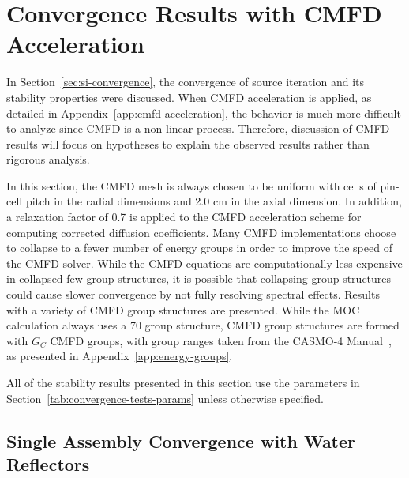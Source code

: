 \section{Convergence Results with CMFD Acceleration}
\label{sec:cmfd-stab}

In Section~\ref{sec:si-convergence}, the convergence of source iteration and its stability properties were discussed. When \ac{CMFD} acceleration is applied, as detailed in Appendix~\ref{app:cmfd-acceleration}, the behavior is much more difficult to analyze since \ac{CMFD} is a non-linear process. Therefore, discussion of \ac{CMFD} results will focus on hypotheses to explain the observed results rather than rigorous analysis. 

In this section, the \ac{CMFD} mesh is always chosen to be uniform with cells of pin-cell pitch in the radial dimensions and 2.0 cm in the axial dimension. In addition, a relaxation factor of 0.7 is applied to the \ac{CMFD} acceleration scheme for computing corrected diffusion coefficients. Many \ac{CMFD} implementations choose to collapse to a fewer number of energy groups in order to improve the speed of the \ac{CMFD} solver. While the \ac{CMFD} equations are computationally less expensive in collapsed few-group structures, it is possible that collapsing group structures could cause slower convergence by not fully resolving spectral effects. Results with a variety of \ac{CMFD} group structures are presented. While the \ac{MOC} calculation always uses a 70 group structure, \ac{CMFD} group structures are formed with $G_C$ \ac{CMFD} groups, with group ranges taken from the CASMO-4 Manual~\cite{edenius1995casmo}, as presented in Appendix~\ref{app:energy-groups}.

All of the stability results presented in this section use the parameters in Section~\ref{tab:convergence-tests-params} unless otherwise specified.

\subsection{Single Assembly Convergence with Water Reflectors}
\label{sec:sa-axial-ref}

